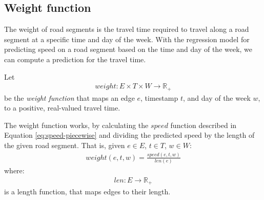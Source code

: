 

\subsection{Weight function}\label{sec:weight-function}
The weight of road segments is the travel time required to travel along a road segment at a specific time and day of the week. With the regression model for predicting speed on a road segment based on the time and day of the week, we can compute a prediction for the travel time. 

Let
\begin{align}
weight: E \times T \times W \rightarrow \mathbb{R_+}
\end{align}
be the \emph{weight function} that maps an edge $e$, timestamp $t$, and day of the week $w$, to a positive, real-valued travel time.

The weight function works, by calculating the $speed$ function described in Equation \ref{eq:speed-piecewise} and dividing the predicted speed by the length of the given road segment. That is, given $e \in E$, $t \in T$, $w \in W$:
\begin{align}
weight(e,t,w) = \frac{speed(e,t,w)}{len(e)}
\end{align}
where:
\begin{align}
len:E \rightarrow \mathbb{R_+}
\end{align}
is a length function, that maps edges to their length.